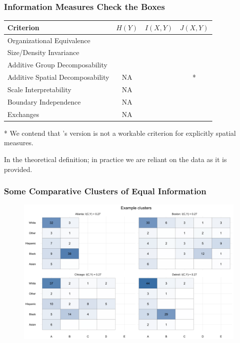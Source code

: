 \documentclass{beamer}
\begin{document}
	\begin{frame}\frametitle{Information Measures Check the Boxes}
		
		\begin{tabular}{l | c | c | c}
			\textbf{Criterion} & $H(Y)$ & $I(X,Y)$ & $J(X,Y)$ \\
			\hline
			Organizational Equivalence & \textcolor{mLightGreen}{\CheckmarkBold} & \textcolor{mLightGreen}{\CheckmarkBold} & \textcolor{mLightGreen}{\CheckmarkBold} \\ 
			Size/Density Invariance & \textcolor{mLightGreen}{\CheckmarkBold} & \textcolor{mLightGreen}{\CheckmarkBold} & \textcolor{mLightGreen}{\CheckmarkBold} \\ 
			Additive Group Decomposability & \textcolor{mLightGreen}{\CheckmarkBold} & \textcolor{mLightGreen}{\CheckmarkBold} & \textcolor{mLightGreen}{\CheckmarkBold} \\ 
			Additive Spatial Decomposability & NA & \textcolor{mLightGreen}{\CheckmarkBold} &  * \\
			Scale Interpretability & NA & \textcolor{mLightGreen}{\CheckmarkBold} & \textcolor{mLightGreen}{\CheckmarkBold}\\ 
			Boundary Independence & NA & \textcolor{mLightBrown}{\CheckmarkBold} & \textcolor{mLightBrown}{\CheckmarkBold} \\ 
			Exchanges & NA & \textcolor{mLightGreen}{\CheckmarkBold} & \textcolor{mLightGreen}{\CheckmarkBold}
		\end{tabular}

		* We contend that \cite{Reardon2004}'s version is not a workable criterion for explicitly spatial measures. 

		\textcolor{mLightBrown}{\CheckmarkBold} In the theoretical definition; in practice we are reliant on the data as it is provided. 

	\end{frame}
	\begin{frame}[t]\frametitle{Some Comparative Clusters of Equal Information}
	    \begin{figure}
	    	\centering
	    	\includegraphics[width=\textwidth]{figs/example_clusters.png}
	    	
	    \end{figure}
	\end{frame}
\end{document}

